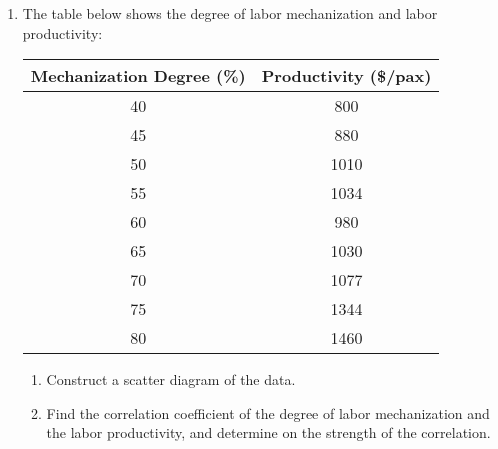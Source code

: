 \documentclass{report}
\begin{document}
\begin{multicols}{2}
\begin{enumerate}
    \item The table below shows the degree of labor mechanization and labor productivity:
          \begin{center}
            \begin{tabular}{|c|c|}
              \hline
              Mechanization Degree (\%) & Productivity (\$/pax) \\
              \hline
              40                        & 800                   \\
              45                        & 880                   \\
              50                        & 1010                  \\
              55                        & 1034                  \\
              60                        & 980                   \\
              65                        & 1030                  \\
              70                        & 1077                  \\
              75                        & 1344                  \\
              80                        & 1460                  \\
              \hline
            \end{tabular}
          \end{center}
          \begin{enumerate}
            \item Construct a scatter diagram of the data.
            \item Find the correlation coefficient of the degree of labor mechanization and the
                  labor productivity, and determine on the strength of the correlation.
          \end{enumerate}


\end{enumerate}
\end{multicols}
\end{document}
